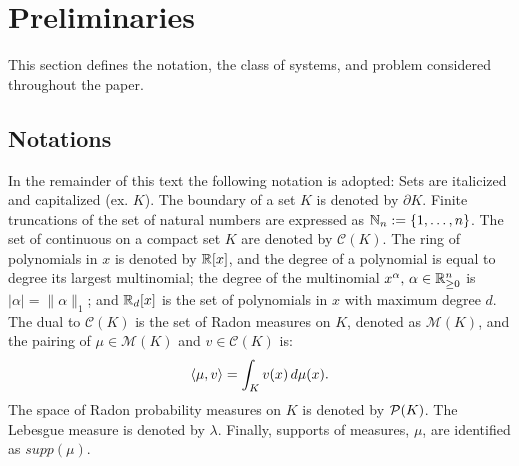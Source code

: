   \section{Preliminaries}
\label{sec:preliminaries}
  This section defines the notation, the class of systems, and problem considered throughout the paper.

  \subsection{Notations}
  In the remainder of this text the following notation is adopted:
Sets are italicized and capitalized (ex. $K$).
The boundary of a set $K$ is denoted by $\partial K$.
Finite truncations of the set of natural numbers are expressed as \mbox{$\mathbb{N}_n:=\{1,\ldots,n\}$}.
The set of continuous on a compact set $K$ are denoted by $\mathcal C(K)$.
The ring of polynomials in $x$ is denoted by $\mathbb{R}[x]$, and the degree of a polynomial is equal to degree its largest multinomial; the degree of the multinomial $x^\alpha,\,\alpha\in \mathbb{R}_{\ge 0}^n$ is $|\alpha|=\|\alpha\|_1$; and $\mathbb{R}_d[x]$ is the set of polynomials in $x$ with maximum degree $d$.
The dual to $\mathcal C(K)$ is the set of Radon measures on $K$, denoted as $\mathcal M(K)$, and the pairing of $\mu\in \mathcal M(K)$ and $v\in \mathcal C(K)$ is:
  \begin{align}
  \left\langle \mu,v\right\rangle=\int_{K}v(x)\,d\mu(x).
  \end{align}
The space of Radon probability measures on $K$ is denoted by ${\cal P}(K)$.
The Lebesgue measure is denoted by $\lambda$.
Finally, supports of measures, $\mu$, are identified as $supp(\mu)$.


